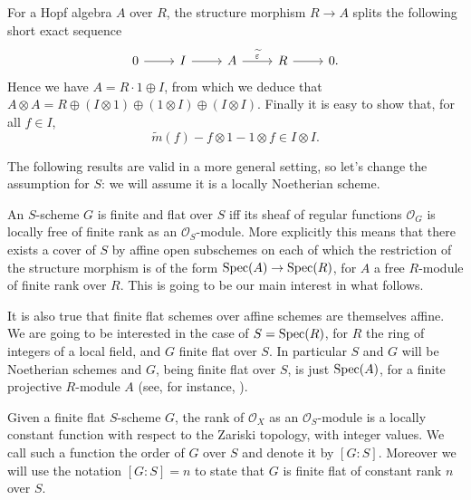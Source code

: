 \begin{defn}
	For a Hopf algebra $A$ over $R$,
	the structure morphism $R \to A$
	splits the following short exact sequence
	\begin{equation*}
	\begin{tikzcd}
		0 \arrow[r, "", rightarrow] &
		I \arrow[r, "", rightarrow] &
		A \arrow[r, "\widetilde{\varepsilon}", rightarrow] &
		R \arrow[r, "", rightarrow] &
		0.
	\end{tikzcd}
	\end{equation*}
	Hence we have $A = R \cdot 1 \oplus I$,
	from which we deduce that $A \otimes A = R \oplus \left( I \otimes 1 \right) \oplus
	\left( 1 \otimes I \right) \oplus \left( I \otimes I \right)$.
	Finally it is easy to show that, for all $f \in I$,
	\begin{equation*}
		\widetilde{m}(f) - f \otimes 1 - 1 \otimes f \in I \otimes I
	.\end{equation*} 
\end{defn}


\noindent
The following results are valid in a more general setting, so let's change
the assumption for $S$: we will assume it is a locally Noetherian scheme.
\begin{rem}\label{rem:finiteGSMotivation}
	An $S$-scheme $G$ is finite and flat over $S$ iff its sheaf of regular functions
	$\mathcal{O}_G$ is locally free of finite rank as an $\mathcal{O}_S$-module.
	More explicitly this means that there exists a cover of $S$ by affine open subschemes
	on each of which the restriction of the structure morphism is of the form
	$\operatorname{Spec}(A) \to \operatorname{Spec}(R)$, for $A$ a free $R$-module of finite rank over $R$. 
	This is going to be our main interest in what follows.

	It is also true that finite flat schemes over affine schemes
	are themselves affine. 
	We are going to be interested in the case of $S = \operatorname{Spec}(R)$,
	for $R$ the ring of integers of a local field,
	and $G$ finite flat over $S$.
	In particular $S$ and $G$ will be Noetherian schemes
	and $G$, being finite flat over $S$, is just $\operatorname{Spec}(A)$,
	for a finite projective $R$-module $A$ (see, for instance, 
	\cite[\href{https://stacks.math.columbia.edu/tag/00NX}{Lemma 00NX}]{SP}).
\end{rem}


\begin{defn}
	Given a finite flat $S$-scheme $G$, the rank of $\mathcal{O}_X$ as
	an $\mathcal{O}_S$-module is a locally constant function with respect
	to the Zariski topology, with integer values.
	We call such a function the order of $G$ over $S$ and denote it by $[G:S]$.
	Moreover we will use the notation $[G:S] = n$ to state that $G$ is finite flat of
	constant rank $n$ over $S$.
\end{defn}



